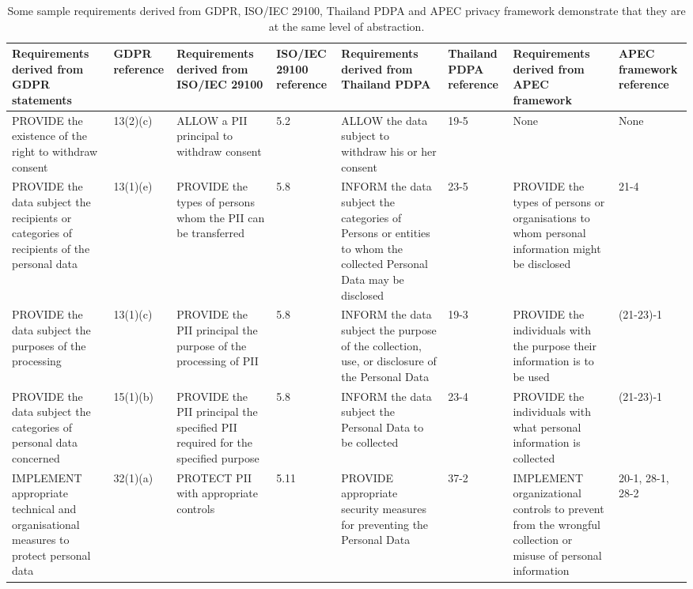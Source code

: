 \documentclass{article}
\begin{document}
\begin{landscape}
	\begin{table}
		\centering
		\caption{Some sample requirements derived from GDPR, ISO/IEC 29100, Thailand PDPA and APEC privacy framework demonstrate that they are at the same level of abstraction.}
		\label{tab:GDPR-ISO-req-mapping}
		\begin{tabular}{p{4cm} p{1.25cm} p{4cm} p{1.25cm} p{4cm} p{1.25cm} p{4cm} p{1.25cm}}
			\toprule
			\textbf{Requirements derived from GDPR statements} & \textbf{GDPR reference} & \textbf{Requirements derived from ISO/IEC 29100} & \textbf{ISO/IEC 29100 reference} &
			\textbf{Requirements derived from Thailand PDPA} & \textbf{Thailand PDPA reference} &
			\textbf{Requirements derived from APEC framework} & \textbf{APEC framework reference} \\
			\midrule
			PROVIDE the existence of the right to withdraw consent & 13(2)(c)
			& ALLOW a PII principal to withdraw consent & 5.2
			& ALLOW the data subject to withdraw his or her consent & 19-5
			& None & None \\
			PROVIDE the data subject the recipients or categories of recipients of the personal data & 13(1)(e)
			& PROVIDE the types of persons whom the PII can be transferred & 5.8
			& INFORM the data subject the categories of Persons or entities to whom the collected Personal Data may be disclosed & 23-5
			& PROVIDE the types of persons or organisations to whom personal information might be disclosed & 21-4\\
			PROVIDE the data subject the purposes of the processing & 13(1)(c)
			& PROVIDE the PII principal the purpose of the processing of PII & 5.8
			& INFORM the data subject the purpose of the collection, use, or disclosure of the Personal Data & 19-3
			& PROVIDE the individuals with the purpose their information is to be used & (21-23)-1 \\
			PROVIDE the data subject the categories of personal data concerned & 15(1)(b)
			& PROVIDE the PII principal the specified PII required for the specified purpose & 5.8
			& INFORM the data subject the Personal Data to be collected & 23-4
			& PROVIDE the individuals with what personal information is collected & (21-23)-1 \\
			IMPLEMENT appropriate technical and organisational measures to protect personal data & 32(1)(a)
			& PROTECT PII with appropriate controls & 5.11
			& PROVIDE appropriate security measures for preventing the Personal Data & 37-2
			& IMPLEMENT organizational controls to prevent from the wrongful collection or misuse of personal information & 20-1, 28-1, 28-2\\ \bottomrule
		\end{tabular}
	\end{table}	
\end{landscape}
\end{document}
